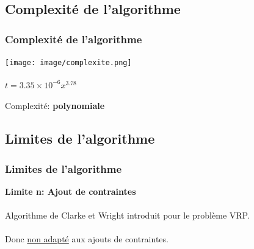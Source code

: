 \documentclass[10pt]{beamer}
\newenvironment{changemargin}[2]{
\begin{list}{}{
    \setlength{\topsep}{0pt}
    \setlength{\leftmargin}{#1}
	\setlength{\rightmargin}{#2}
 	\setlength{\listparindent}{\parindent}
    \setlength{\itemindent}{\parindent}
    \setlength{\parsep}{\parskip}
	}\item[]}{\end{list}}
\begin{document}
	\subsection{Complexité de l'algorithme}

	\begin{frame} 
		\frametitle{Complexité de l'algorithme}
		\begin{center}
			\texttt{[image: image/complexite.png]} \  \\ \  \\
			\( t = 3.35\times10^{ - 6}x^{3.78} \)
			\\ \  \\
			Complexité: \textbf{polynomiale}
		\end{center}
	\end{frame}


	\subsection{Limites de l'algorithme}

	\begin{frame}
		\frametitle{Limites de l'algorithme}
		\begin{center}
			\textbf{Limite n: Ajout de contraintes} \  \\  \  \\
		Algorithme de Clarke et Wright introduit pour le problème VRP\@. \\ \  \\
		Donc \underline{non adapté} aux ajouts de contraintes.
		\end{center}
	\end{frame}
	
\end{document}
